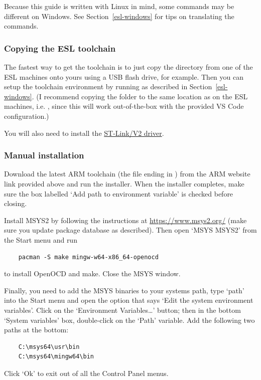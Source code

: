 Because this guide is written with Linux in mind, some commands may be
different on Windows. See Section~\ref{esl-windows} for tips on translating
the commands.

\subsubsection{Copying the ESL toolchain}

The fastest way to get the toolchain is to just copy the
 directory from one of the ESL machines onto
yours using a USB flash drive, for example. Then you can setup the toolchain
environment by running
as described in Section~\ref{esl-windows}. (I recommend copying the folder to
the same location as on the ESL machines, i.e. ,
since this will work out-of-the-box with the provided VS Code configuration.)

You will also need to install the
\href{https://www.st.com/en/development-tools/stsw-link009.html}{ST-Link/V2
driver}.

\subsubsection{Manual installation}

Download the latest ARM toolchain (the file ending in
) from the ARM website link
provided above and run the installer. When the installer completes, make sure
the box labelled `Add path to environment variable' is checked before closing.

Install MSYS2 by following the instructions at \url{https://www.msys2.org/}
(make sure you update package database as described). Then open `MSYS MSYS2'
from the Start menu and run
\begin{verbatim}
    pacman -S make mingw-w64-x86_64-openocd
\end{verbatim}
to install OpenOCD and make. Close the MSYS window.

Finally, you need to add the MSYS binaries to your systems path, type `path'
into the Start menu and open the option that says `Edit the system environment
variables'. Click on the `Environment Variables\ldots' button; then in the
bottom `System variables' box, double-click on the `Path' variable. Add the
following two paths at the bottom:
\begin{verbatim}
    C:\msys64\usr\bin
    C:\msys64\mingw64\bin
\end{verbatim}
Click `Ok' to exit out of all the Control Panel menus.

